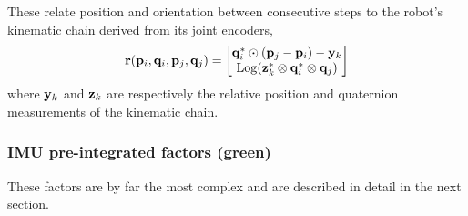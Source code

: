 These relate position and orientation between consecutive steps to the robot's kinematic chain derived from its joint encoders,
%
\begin{align}
{\bf r}({\bf p}_i,{\bf q}_i,{\bf p}_j,{\bf q}_j) = \begin{bmatrix}
{\bf q}_i^*\odot({\bf p}_j-{\bf p}_i) - {\bf y}_k \\
\operatorname*{Log}({\bf z}_k^*\otimes{\bf q}_i^*\otimes{\bf q}_j)
\end{bmatrix}
\end{align}
%
where ${\bf y}_k$ and ${\bf z}_k$ are respectively the relative position and quaternion measurements of the kinematic chain.

\subsubsection{IMU pre-integrated factors (green)}

These factors are by far the most complex and are described in detail in the next section.
